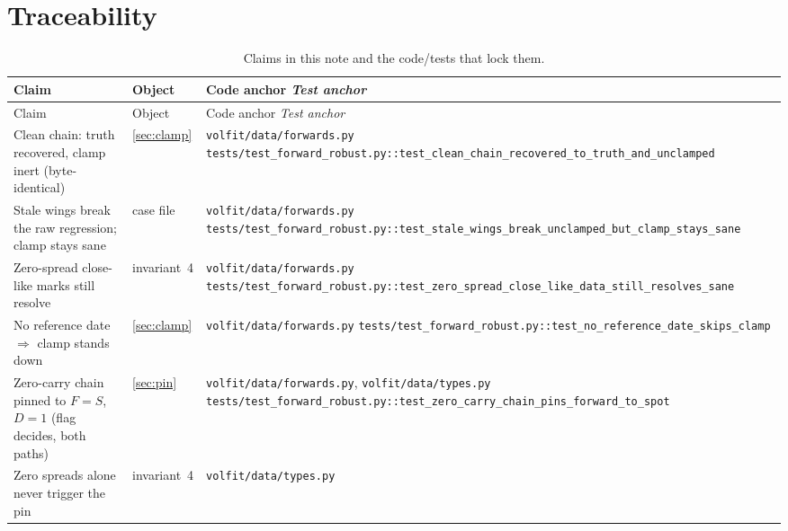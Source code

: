 \documentclass[11pt]{article}
\begin{document}
\section{Traceability}
\label{app:trace}

\begingroup
\small
\setlength{\tabcolsep}{4pt}
\renewcommand{\arraystretch}{1.15}
\begin{longtable}{@{}p{}p{}p{}@{}}
\caption{Claims in this note and the code/tests that lock them.}\label{tab:trace}\\
\toprule Claim & Object & Code anchor \newline \emph{Test anchor}\\ \midrule
\endfirsthead
\toprule Claim & Object & Code anchor \newline \emph{Test anchor}\\ \midrule
\endhead
Clean chain: truth recovered, clamp inert (byte-identical) &
\cref{sec:clamp} &
\nolinkurl{volfit/data/forwards.py}\newline
\nolinkurl{tests/test_forward_robust.py::test_clean_chain_recovered_to_truth_and_unclamped}\\
\addlinespace
Stale wings break the raw regression; clamp stays sane &
case file &
\nolinkurl{volfit/data/forwards.py}\newline
\nolinkurl{tests/test_forward_robust.py::test_stale_wings_break_unclamped_but_clamp_stays_sane}\\
\addlinespace
Zero-spread close-like marks still resolve &
invariant~4 &
\nolinkurl{volfit/data/forwards.py}\newline
\nolinkurl{tests/test_forward_robust.py::test_zero_spread_close_like_data_still_resolves_sane}\\
\addlinespace
No reference date $\Rightarrow$ clamp stands down &
\cref{sec:clamp} &
\nolinkurl{volfit/data/forwards.py}\newline
\nolinkurl{tests/test_forward_robust.py::test_no_reference_date_skips_clamp}\\
\addlinespace
Zero-carry chain pinned to $F=S$, $D=1$ (flag decides, both paths) &
\cref{sec:pin} &
\nolinkurl{volfit/data/forwards.py}, \nolinkurl{volfit/data/types.py}\newline
\nolinkurl{tests/test_forward_robust.py::test_zero_carry_chain_pins_forward_to_spot}\\
\addlinespace
Zero spreads alone never trigger the pin &
invariant~4 &
\nolinkurl{volfit/data/types.py}\newline

\end{longtable}
\end{document}
